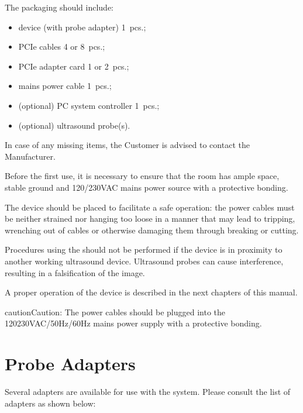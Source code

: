 \documentclass[letterpaper,10pt,english]{sphinxmanual}
\begin{document}
\sphinxAtStartPar
The packaging should include:
\begin{itemize}
\item {} 
\sphinxAtStartPar
{} device (with probe adapter) \textendash{} 1 pcs.;

\item {} 
\sphinxAtStartPar
PCIe cables \textendash{} 4 or 8 pcs.;

\item {} 
\sphinxAtStartPar
PCIe adapter card \textendash{} 1 or 2 pcs.;

\item {} 
\sphinxAtStartPar
mains power cable \textendash{} 1 pcs.;

\item {} 
\sphinxAtStartPar
(optional) PC system controller \textendash{} 1 pcs.;

\item {} 
\sphinxAtStartPar
(optional) ultrasound probe(s).

\end{itemize}

\sphinxAtStartPar
In case of any missing items, the Customer is advised to contact the
Manufacturer.

\sphinxAtStartPar
Before the first use, it is necessary to ensure that the room has ample
space, stable ground and 120/230VAC mains power source with a protective
bonding.

\sphinxAtStartPar
The device should be placed to facilitate a safe operation: the power
cables must be neither strained nor hanging too loose in a manner that
may lead to tripping, wrenching out of cables or otherwise damaging them
through breaking or cutting.

\sphinxAtStartPar
Procedures using the  should not be performed if the device is
in proximity to another working ultrasound device. Ultrasound probes can
cause interference, resulting in a falsification of the image.

\sphinxAtStartPar
A proper operation of the device is described in the next chapters of
this manual.

\begin{sphinxadmonition}{caution}{Caution:}
\sphinxAtStartPar
The power cables should be plugged into the 120\sphinxhyphen{}230VAC/50Hz/60Hz mains power supply with a protective bonding.
\end{sphinxadmonition}


\section{Probe Adapters}
\label{\detokenize{content/set-up:probe-adapters}}
\sphinxAtStartPar
Several adapters are available for use with the  system. Please
consult the list of adapters as shown below:
\end{document}
